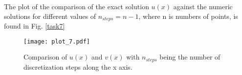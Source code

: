The plot of the comparison of the exact solution $u(x)$ against the numeric solutions for different values of $n_{steps} = n - 1$, where n is numbers of points, is found in Fig. \ref{task7} 

\begin{figure}
    \centering
    \texttt{[image: plot\_7.pdf]}
    \caption{Comparison of $u(x)$ and $v(x)$ with $n_{steps}$ being the number of discretization steps along the x axis.}
    \label{fig:task7}
\end{figure}
